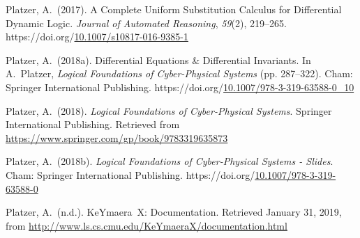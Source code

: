 \documentclass[12pt,twoside]{article}
\begin{document}
{\begin{thebibliography}{222}
\mdbibitemlabel{}Platzer, A.~(2017). A Complete Uniform Substitution Calculus for Differential Dynamic Logic. \emph{Journal of Automated Reasoning}, \emph{59}(2), 219–265. https://doi.org/\href{https://dx.doi.org/10.1007/s10817-016-9385-1}{10.1007/s10817-016-9385-1}\label{platzer_complete_2017}%

\mdbibitemlabel{}Platzer, A.~(2018a). Differential Equations \& Differential Invariants. In A.~Platzer, \emph{Logical Foundations of Cyber-Physical Systems} (pp. 287–322). Cham: Springer International Publishing. https://doi.org/\href{https://dx.doi.org/10.1007/978-3-319-63588-0_10}{10.1007/978-3-319-63588-0\_10}\label{platzer_differential_2018}%

\mdbibitemlabel{}Platzer, A.~(2018). \emph{Logical Foundations of Cyber-Physical Systems}. Springer International Publishing. Retrieved from \href{https://www.springer.com/gp/book/9783319635873}{{\ttfamily https://\hspace{0pt}www.\hspace{0pt}springer.\hspace{0pt}com/\hspace{0pt}gp/\hspace{0pt}book/\hspace{0pt}9783319635873}}\label{platzer_logical_2018}%

\mdbibitemlabel{}Platzer, A.~(2018b). \emph{Logical Foundations of Cyber-Physical Systems - Slides}. Cham: Springer International Publishing. https://doi.org/\href{https://dx.doi.org/10.1007/978-3-319-63588-0}{10.1007/978-3-319-63588-0}\label{platzer_logical_2018-1}%

\mdbibitemlabel{}Platzer, A.~(n.d.). KeYmaera X: Documentation. Retrieved January 31, 2019, from \href{http://www.ls.cs.cmu.edu/KeYmaeraX/documentation.html}{{\ttfamily http://\hspace{0pt}www.\hspace{0pt}ls.\hspace{0pt}cs.\hspace{0pt}cmu.\hspace{0pt}edu/\hspace{0pt}KeYmaeraX/\hspace{0pt}documentation.\hspace{0pt}html}}\label{platzer_keymaera_nodate}%


\end{thebibliography}}
\end{document}
